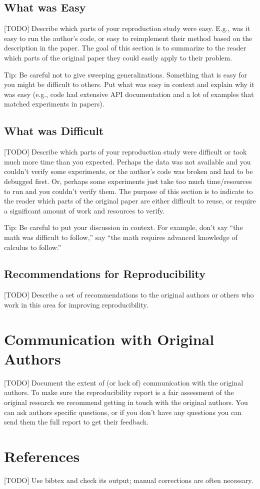 \documentclass{article}
\begin{document}
\subsection{What was Easy}

[TODO] Describe which parts of your reproduction study were easy. E.g., was it easy to run the author's code, or easy to reimplement their method based on the description in the paper. The goal of this section is to summarize to the reader which parts of the original paper they could easily apply to their problem. 

Tip: Be careful not to give sweeping generalizations. Something that is easy for you might be difficult to others. Put what was easy in context and explain why it was easy (e.g., code had extensive API documentation and a lot of examples that matched experiments in papers). 

\subsection{What was Difficult}

[TODO] Describe which parts of your reproduction study were difficult or took much more time than you expected. Perhaps the data was not available and you couldn't verify some experiments, or the author's code was broken and had to be debugged first. Or, perhaps some experiments just take too much time/resources to run and you couldn't verify them. The purpose of this section is to indicate to the reader which parts of the original paper are either difficult to reuse, or require a significant amount of work and resources to verify. 

Tip: Be careful to put your discussion in context. For example, don't say ``the math was difficult to follow,'' say ``the math requires advanced knowledge of calculus to follow.'' 

\subsection{Recommendations for Reproducibility}

[TODO] Describe a set of recommendations to the original authors or others who work in this area for improving reproducibility.

\section*{Communication with Original Authors}

[TODO] Document the extent of (or lack of) communication with the original authors. To make sure the reproducibility report is a fair assessment of the original research we recommend getting in touch with the original authors. You can ask authors specific questions, or if you don't have any questions you can send them the full report to get their feedback.


\section*{References}

[TODO] Use bibtex and check its output; manual corrections are often necessary.
\end{document}
